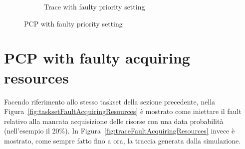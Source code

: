 \begin{figure}[htbp]
\begin{subfigure}{0.4\textwidth}
{        }
        \caption{Trace with faulty priority setting}
        \label{fig:traceFaultSetPriority}
        \vfill
    \end{subfigure}
    \caption{PCP with faulty priority setting}
\end{figure}

\section{PCP with faulty acquiring resources}
Facendo riferimento allo stesso taskset della sezione precedente, nella Figura~\ref{fig:tasksetFaultAcquiringResources} è mostrato come iniettare il fault relativo alla mancata acquisizione delle risorse con una data probabilità (nell'esempio il 20\%). In Figura~\ref{fig:traceFaultAcquiringResources} invece è mostrato, come sempre fatto fino a ora, la traccia generata dalla simulazione.


